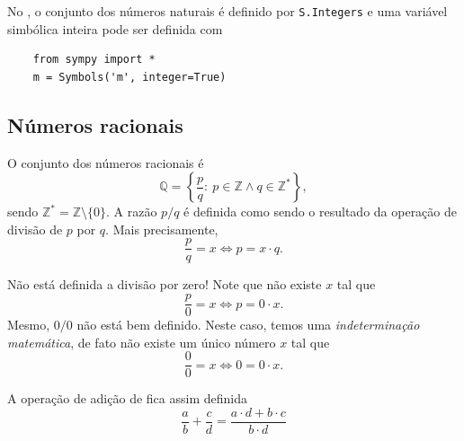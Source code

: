 \ifispython
\begin{obs}
  No \sympy, o conjunto dos números naturais é definido por \lstinline!S.Integers! e uma variável simbólica inteira pode ser definida com
  \begin{lstlisting}
    from sympy import *
    m = Symbols('m', integer=True)
  \end{lstlisting}
\end{obs}
\fi

\subsection{Números racionais}

O conjunto dos números racionais é
\begin{equation}
  \mathbb{Q} = \left\{\frac{p}{q}:~p\in\mathbb{Z}\land q\in\mathbb{Z}^*\right\},
\end{equation}
sendo $\mathbb{Z}^*=\mathbb{Z}\setminus\{0\}$. A razão $p/q$ é definida como sendo o resultado da operação de divisão de $p$ por $q$. Mais precisamente,
\begin{equation}
  \frac{p}{q} = x \Leftrightarrow p = x\cdot q.
\end{equation}

\begin{obs}
  Não está definida a divisão por zero! Note que não existe $x$ tal que
  \begin{equation}
    \frac{p}{0} = x \Leftrightarrow p = 0\cdot x.
  \end{equation}
  Mesmo, $0/0$ não está bem definido. Neste caso, temos uma \emph{indeterminação matemática}, de fato não existe um único número $x$ tal que
  \begin{equation}
    \frac{0}{0} = x \Leftrightarrow 0 = 0\cdot x.
  \end{equation}
\end{obs}

A operação de adição de fica assim definida
\begin{equation}
  \frac{a}{b} + \frac{c}{d} = \frac{a\cdot d + b\cdot c}{b\cdot d}
\end{equation}

